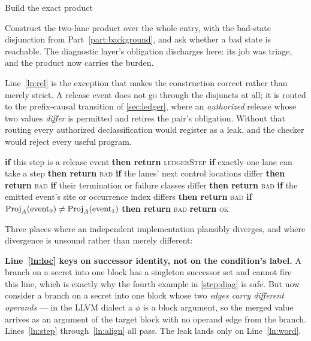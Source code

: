 \begin{step}{Build the exact product}{%
}
\label{step:product}

Construct the two-lane product over the whole entry, with the bad-state
disjunction from Part~\ref{part:background}, and ask whether a bad state is
reachable. The diagnostic layer's obligation discharges here: its job was triage,
and the product now carries the burden.

Line~\ref{ln:rel} is the exception that makes the construction correct rather
than merely strict. A release event does not go through the disjuncts at all; it
is routed to the prefix-causal transition of \cref{sec:ledger}, where an
\emph{authorized} release whose two values \emph{differ} is permitted and retires
the pair's obligation. Without that routing every authorized declassification
would register as a leak, and the checker would reject every useful program.

\begin{algorithm}[H]
\caption{Bad-state predicate for coalition $\coal$ at aligned step $k$. Applies
\emph{outside} the release transition of \cref{sec:ledger}; a release event is
routed there instead, and an authorized release with differing values is
permitted rather than bad.}
\label{alg:bad}
\begin{algorithmic}[1]
\State \label{ln:rel} \textbf{if} this step is a release event \textbf{then return} \textsc{ledgerStep}
\State \label{ln:step} \textbf{if} exactly one lane can take a step \textbf{then return} \textsc{bad}
\State \label{ln:loc}  \textbf{if} the lanes' next control locations differ \textbf{then return} \textsc{bad}
\State \label{ln:status} \textbf{if} their termination or failure classes differ \textbf{then return} \textsc{bad}
\State \label{ln:align} \textbf{if} the emitted event's site or occurrence index differs \textbf{then return} \textsc{bad}
\State \label{ln:word} \textbf{if} $\mathrm{Proj}_A(\text{event}_0) \neq \mathrm{Proj}_A(\text{event}_1)$ \textbf{then return} \textsc{bad}
\State \textbf{return} \textsc{ok}
\end{algorithmic}
\end{algorithm}

Three places where an independent implementation plausibly diverges, and where
divergence is unsound rather than merely different:

\textbf{Line~\ref{ln:loc} keys on successor identity, not on the condition's
label.} A branch on a secret into one block has a singleton successor set and
cannot fire this line, which is exactly why the fourth example in
\cref{step:diag} is safe. But now consider a branch on a secret into one block
whose two \emph{edges carry different operands} --- in the LLVM dialect a
$\phi$ is a block argument, so the merged value arrives as an argument of the
target block with no operand edge from the branch. Lines~\ref{ln:step}
through~\ref{ln:align} all pass. The leak lands only on Line~\ref{ln:word}.


\end{step}
